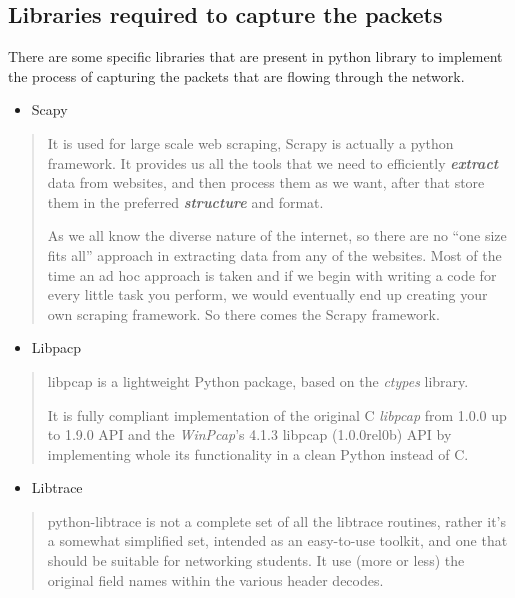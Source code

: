 \documentclass[12pt, a4paper]{report}
\begin{document}
\subsection{Libraries required to capture the packets}

There are some specific libraries that are present in python library to
implement the process of capturing the packets that are flowing through
the network.

\begin{itemize}
\item
  Scapy
\end{itemize}

\begin{quote}
It is used for large scale web scraping, Scrapy is actually a python
framework. It provides us all the tools that we need to efficiently
\emph{\textbf{extract}} data from websites, and then process them as we
want, after that store them in the preferred \emph{\textbf{structure}}
and format.

As we all know the diverse nature of the internet, so there are no ``one
size fits all'' approach in extracting data from any of the websites.
Most of the time an ad hoc approach is taken and if we begin with
writing a code for every little task you perform, we would eventually
end up creating your own scraping framework. So there comes the Scrapy
framework.
\end{quote}

\begin{itemize}
\item
  Libpacp
\end{itemize}

\begin{quote}
libpcap is a lightweight Python package, based on the \emph{ctypes}
library.

It is fully compliant implementation of the original C \emph{libpcap}
from 1.0.0 up to 1.9.0 API and the \emph{WinPcap}'s 4.1.3 libpcap
(1.0.0rel0b) API by implementing whole its functionality in a clean
Python instead of C.
\end{quote}

\begin{itemize}
\item
  Libtrace
\end{itemize}

\begin{quote}
python-libtrace is not a complete set of all the libtrace routines,
rather it's a somewhat simplified set, intended as an easy-to-use
toolkit, and one that should be suitable for networking students. It use
(more or less) the original field names within the various header
decodes.
\end{quote}
\end{document}

